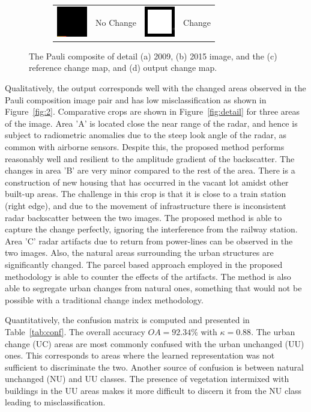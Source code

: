 \begin{figure}[t]
\begin{subfigure}[b]{\columnwidth}
\centering
		\vspace{0.2em}
		\begin{tabular}{c l  c l  }
		 \includegraphics[width=0.02\columnwidth]{Figures/CD/BLK} & No Change   &
		 \includegraphics[width=0.02\columnwidth]{Figures/CD/WHT} & Change
		\end{tabular}
\end{subfigure}
\caption{The Pauli composite of detail (a) 2009, (b) 2015 image, and the (c) reference change map, and (d) output change map.}
\label{fig:3}
\end{figure}



Qualitatively, the  output corresponds well with the changed areas observed in the Pauli composition image pair and has low misclassification as shown in Figure~\ref{fig:2}. Comparative crops are shown in Figure~\ref{fig:detail} for three areas of the image. Area 'A' is located close the near range of the radar, and hence is subject to radiometric anomalies due to the steep look angle of the radar, as common with airborne sensors. Despite this, the proposed method performs reasonably well and resilient to the amplitude gradient of the backscatter. The changes in area 'B' are very minor compared to the rest of the area. There is a construction of new housing that has occurred in the vacant lot amidst other built-up areas. The challenge in this crop is that it is close to a train station (right edge), and due to the movement of infrastructure there is inconsistent radar backscatter between the two images. The proposed method is able to capture the change perfectly, ignoring the interference from the railway station. Area 'C' radar artifacts due to return from power-lines can be observed in the two images. Also, the natural areas surrounding the urban structures are significantly changed. The parcel based approach employed in the proposed methodology is able to counter the effects of the artifacts. The method is also able to segregate urban changes from natural ones, something that would not be possible with a traditional change index methodology.     

Quantitatively, 
the confusion matrix is computed and presented in Table~\ref{tab:conf}.  The overall accuracy $OA = 92.34\%$ with $\kappa = 0.88$. The urban change (UC) areas are most commonly confused with the urban unchanged (UU) ones. This corresponds to areas where the learned representation was not sufficient to discriminate the two.
Another source of confusion is between natural unchanged (NU) and UU classes. The presence of vegetation intermixed with buildings in the UU areas makes it more difficult to discern it from the NU class leading to misclassification.






